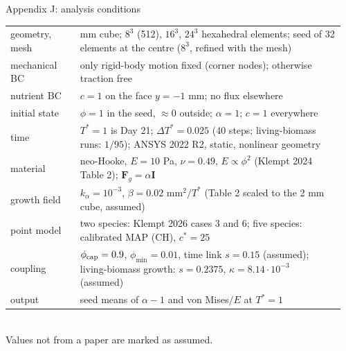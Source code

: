 \documentclass[aspectratio=169,11pt]{beamer}
\begin{document}
\begin{frame}{Appendix J: analysis conditions}
\scriptsize\renewcommand{\arraystretch}{1.15}
\begin{tabular}{@{}>{\raggedright}p{0.2\linewidth}>{\raggedright\arraybackslash}p{0.76\linewidth}@{}}
\toprule
geometry, mesh & 2 mm cube; $8^3$ (512), $16^3$, $24^3$ hexahedral elements; seed of 32 elements at the centre ($8^3$, refined with the mesh)\\
mechanical BC & only rigid-body motion fixed (corner nodes); otherwise traction free\\
nutrient BC & $c=1$ on the face $y=-1$ mm; no flux elsewhere\\
initial state & $\phi=1$ in the seed, $\approx0$ outside; $\alpha=1$; $c=1$ everywhere\\
time & $T^*=1$ is Day 21; $\Delta T^*=0.025$ (40 steps; living-biomass runs: $1/95$); ANSYS 2022 R2, static, nonlinear geometry\\
material & neo-Hooke, $E=10$ Pa, $\nu=0.49$, $E\propto\phi^2$ (Klempt 2024 Table 2); $\mathbf F_g=\alpha\mathbf I$\\
growth field & $k_\alpha=10^{-3}$, $\beta=0.02$ mm$^2/T^*$ (Table 2 scaled to the 2 mm cube, assumed)\\
point model & two species: Klempt 2026 cases 3 and 6; five species: calibrated MAP (CH), $c^*=25$\\
coupling & $\phi_{\rm cap}=0.9$, $\phi_{\min}=0.01$, time link $s=0.15$ (assumed);
            living-biomass growth: $s=0.2375$, $\kappa=8.14\cdot10^{-3}$ (assumed)\\
output & seed means of $\alpha-1$ and von Mises$/E$ at $T^*=1$\\
\bottomrule
\end{tabular}\\[4pt]
Values not from a paper are marked as assumed.
\end{frame}
\end{document}
